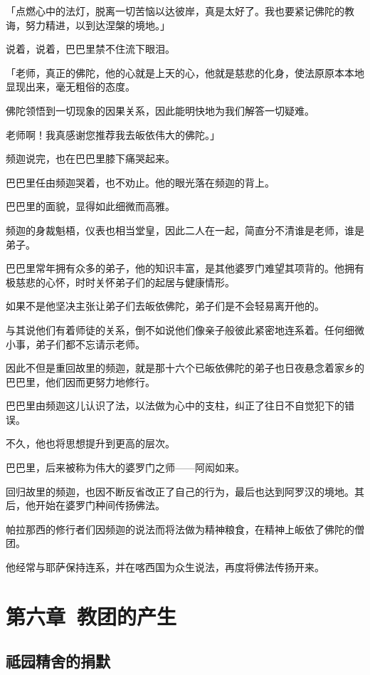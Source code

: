 \documentclass[twoside,openany]{book}
\begin{document}
「点燃心中的法灯，脱离一切苦恼以达彼岸，真是太好了。我也要紧记佛陀的教诲，努力精进，以到达涅槃的境地。」

说着，说着，巴巴里禁不住流下眼泪。

「老师，真正的佛陀，他的心就是上天的心，他就是慈悲的化身，使法原原本本地显现出来，毫无粗俗的态度。

佛陀领悟到一切现象的因果关系，因此能明快地为我们解答一切疑难。

老师啊！我真感谢您推荐我去皈依伟大的佛陀。」





频迦说完，也在巴巴里膝下痛哭起来。

巴巴里任由频迦哭着，也不劝止。他的眼光落在频迦的背上。

巴巴里的面貌，显得如此细微而高雅。

频迦的身裁魁梧，仪表也相当堂皇，因此二人在一起，简直分不清谁是老师，谁是弟子。

巴巴里常年拥有众多的弟子，他的知识丰富，是其他婆罗门难望其项背的。他拥有极慈悲的心怀，时时关怀弟子们的起居与健康情形。

如果不是他坚决主张让弟子们去皈依佛陀，弟子们是不会轻易离开他的。

与其说他们有着师徒的关系，倒不如说他们像亲子般彼此紧密地连系着。任何细微小事，弟子们都不忘请示老师。

因此不但是重回故里的频迦，就是那十六个已皈依佛陀的弟子也日夜悬念着家乡的巴巴里，他们因而更努力地修行。

巴巴里由频迦这儿认识了法，以法做为心中的支柱，纠正了往日不自觉犯下的错误。

不久，他也将思想提升到更高的层次。

巴巴里，后来被称为伟大的婆罗门之师——阿闳如来。

回归故里的频迦，也因不断反省改正了自己的行为，最后也达到阿罗汉的境地。其后，他开始在婆罗门种间传扬佛法。

帕拉那西的修行者们因频迦的说法而将法做为精神粮食，在精神上皈依了佛陀的僧团。

他经常与耶萨保持连系，并在喀西国为众生说法，再度将佛法传扬开来。

\chapter{第六章\ 教团的产生}\label{ch6}

\section{祗园精舍的捐默}\label{sec6.1}
\end{document}
